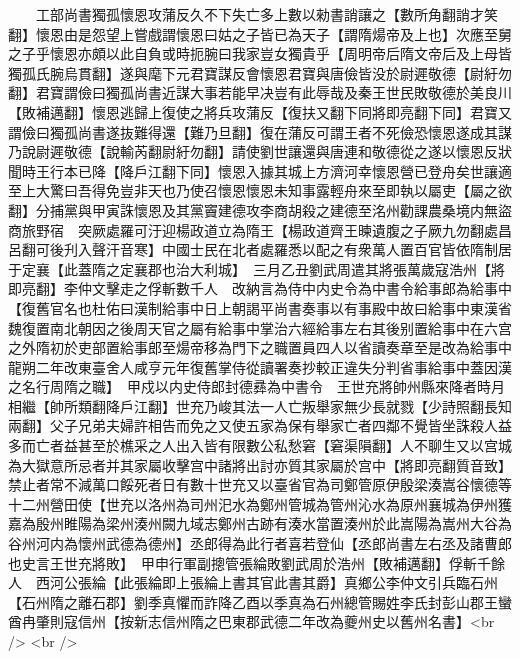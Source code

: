 　　工部尚書獨孤懷恩攻蒲反久不下失亡多上數以勑書誚讓之【數所角翻誚才笑翻】懷恩由是怨望上嘗戲謂懷恩曰姑之子皆已為天子【謂隋煬帝及上也】次應至舅之子乎懷恩亦頗以此自負或時扼腕曰我家豈女獨貴乎【周明帝后隋文帝后及上母皆獨孤氏腕烏貫翻】遂與麾下元君寶謀反會懷恩君寶與唐儉皆没於尉遲敬德【尉紆勿翻】君寶謂儉曰獨孤尚書近謀大事若能早决豈有此辱哉及秦王世民敗敬德於美良川【敗補邁翻】懷恩逃歸上復使之將兵攻蒲反【復扶又翻下同將即亮翻下同】君寶又謂儉曰獨孤尚書遂抜難得還【難乃旦翻】復在蒲反可謂王者不死儉恐懷恩遂成其謀乃說尉遲敬德【說輸芮翻尉紆勿翻】請使劉世讓還與唐連和敬德從之遂以懷恩反狀聞時王行本已降【降戶江翻下同】懷恩入據其城上方濟河幸懷恩營已登舟矣世讓適至上大驚曰吾得免豈非天也乃使召懷恩懷恩未知事露輕舟來至即執以屬吏【屬之欲翻】分捕黨與甲寅誅懷恩及其黨竇建德攻李商胡殺之建德至洺州勸課農桑境内無盜商旅野宿　突厥處羅可汙迎楊政道立為隋王【楊政道齊王暕遺腹之子厥九勿翻處昌呂翻可後刋入聲汗音寒】中國士民在北者處羅悉以配之有衆萬人置百官皆依隋制居于定襄【此蓋隋之定襄郡也治大利城】　三月乙丑劉武周遣其將張萬歲寇浩州【將即亮翻】李仲文擊走之俘斬數千人　改納言為侍中内史令為中書令給事郎為給事中【復舊官名也杜佑曰漢制給事中日上朝謁平尚書奏事以有事殿中故曰給事中東漢省魏復置南北朝因之後周天官之屬有給事中掌治六經給事左右其後别置給事中在六宫之外隋初於吏部置給事郎至煬帝移為門下之職置員四人以省讀奏章至是改為給事中龍朔二年改東臺舍人咸亨元年復舊掌侍從讀署奏抄較正違失分判省事給事中蓋因漢之名行周隋之職】　甲戍以内史侍郎封德彞為中書令　王世充將帥州縣來降者時月相繼【帥所類翻降戶江翻】世充乃峻其法一人亡叛舉家無少長就戮【少詩照翻長知兩翻】父子兄弟夫婦許相告而免之又使五家為保有舉家亡者四鄰不覺皆坐誅殺人益多而亡者益甚至於樵采之人出入皆有限數公私愁窘【窘渠隕翻】人不聊生又以宫城為大獄意所忌者并其家屬收擊宫中諸將出討亦質其家屬於宫中【將即亮翻質音致】禁止者常不減萬口餒死者日有數十世充又以臺省官為司鄭管原伊殷梁湊嵩谷懷德等十二州營田使【世充以洛州為司州汜水為鄭州管城為管州沁水為原州襄城為伊州獲嘉為殷州睢陽為梁州湊州闕九域志鄭州古跡有湊水當置湊州於此嵩陽為嵩州大谷為谷州河内為懷州武德為德州】丞郎得為此行者喜若登仙【丞郎尚書左右丞及諸曹郎也史言王世充將敗】　甲申行軍副摠管張綸敗劉武周於浩州【敗補邁翻】俘斬千餘人　西河公張綸【此張綸即上張綸上書其官此書其爵】真鄉公李仲文引兵臨石州【石州隋之離石郡】劉季真懼而詐降乙酉以季真為石州總管賜姓李氏封彭山郡王蠻酋冉肇則寇信州【按新志信州隋之巴東郡武德二年改為夔州史以舊州名書】<br />
<br />
